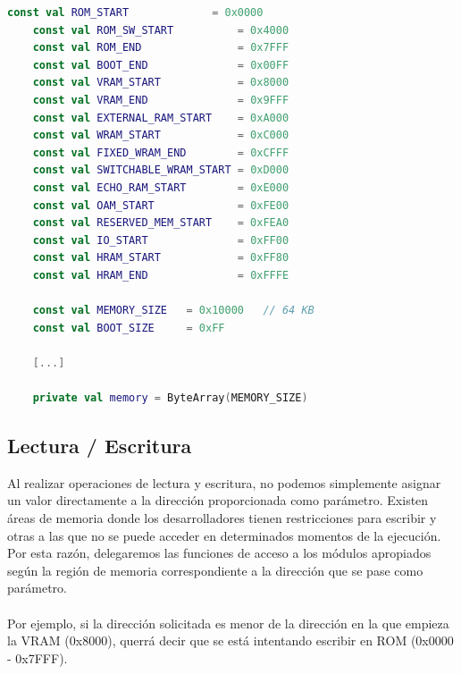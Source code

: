 \begin{lstlisting}[language=Kotlin, caption={Declaraciones iniciales de Memoria}, label={code:kotlinmem}]
    const val ROM_START             = 0x0000
    const val ROM_SW_START          = 0x4000
    const val ROM_END               = 0x7FFF
    const val BOOT_END              = 0x00FF
    const val VRAM_START            = 0x8000
    const val VRAM_END              = 0x9FFF
    const val EXTERNAL_RAM_START    = 0xA000
    const val WRAM_START            = 0xC000
    const val FIXED_WRAM_END        = 0xCFFF
    const val SWITCHABLE_WRAM_START = 0xD000
    const val ECHO_RAM_START        = 0xE000
    const val OAM_START             = 0xFE00
    const val RESERVED_MEM_START    = 0xFEA0
    const val IO_START              = 0xFF00
    const val HRAM_START            = 0xFF80
    const val HRAM_END              = 0xFFFE
    
    const val MEMORY_SIZE   = 0x10000   // 64 KB
    const val BOOT_SIZE     = 0xFF

    [...]

    private val memory = ByteArray(MEMORY_SIZE)
\end{lstlisting}

\subsection{Lectura / Escritura}

Al realizar operaciones de lectura y escritura, no podemos simplemente asignar un valor directamente a la dirección proporcionada como parámetro. Existen áreas de memoria donde los desarrolladores tienen restricciones para escribir y otras a las que no se puede acceder en determinados momentos de la ejecución. Por esta razón, delegaremos las funciones de acceso a los módulos apropiados según la región de memoria correspondiente a la dirección que se pase como parámetro.
\\\\
Por ejemplo, si la dirección solicitada es menor de la dirección en la que empieza la VRAM (0x8000), querrá decir que se está intentando escribir en ROM (0x0000 - 0x7FFF).

